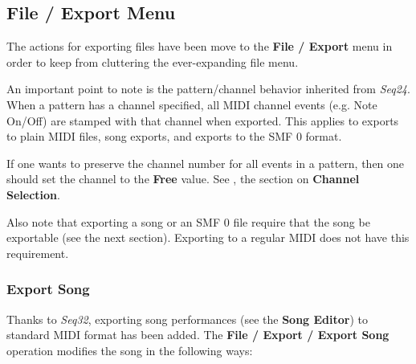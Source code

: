 \subsection{File / Export Menu}
\label{subsec:midi_export_file_export_menu}

   The actions for exporting files have been move to the
   \textbf{File / Export} menu in order to keep from cluttering the
   ever-expanding file menu.

   An important point to note is the pattern/channel behavior inherited
   from \textsl{Seq24}.
   When a pattern has a channel specified, all MIDI channel events
   (e.g. Note On/Off) are stamped with that channel when exported.
   This applies to exports to plain MIDI files, song exports, and
   exports to the SMF 0 format.

   If one wants to preserve the channel number for all events in
   a pattern, then one should set the channel to the \textbf{Free}
   value.  See , the section on
   \textbf{Channel Selection}.

   Also note that exporting a song or an SMF 0 file require that the song
   be exportable (see the next section).
   Exporting to a regular MIDI does not have this requirement.

\subsubsection{Export Song}
\label{subsubsec:midi_export_song_export}

   Thanks to \textsl{Seq32}, exporting song performances (see the
   \textbf{Song Editor}) to standard MIDI format has been added.
   The \textbf{File / Export / Export Song} operation modifies the song in the
   following ways:

